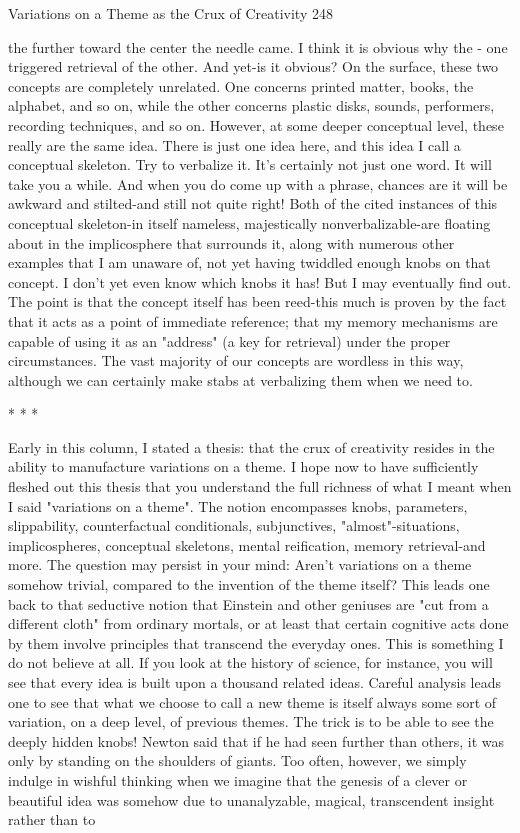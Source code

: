 Variations on a Theme as the Crux of Creativity                                       248

the further toward the center the needle came. I think it is obvious why the - one
triggered retrieval of the other. And yet-is it obvious?
        On the surface, these two concepts are completely unrelated. One concerns
printed matter, books, the alphabet, and so on, while the other concerns plastic disks,
sounds, performers, recording techniques, and so on. However, at some deeper
conceptual level, these really are the same idea. There is just one idea here, and this
idea I call a conceptual skeleton. Try to verbalize it. It's certainly not just one word. It
will take you a while. And when you do come up with a phrase, chances are it will be
awkward and stilted-and still not quite right!
        Both of the cited instances of this conceptual skeleton-in itself nameless,
majestically nonverbalizable-are floating about in the implicosphere that surrounds it,
along with numerous other examples that I am unaware of, not yet having twiddled
enough knobs on that concept. I don't yet even know which knobs it has! But I may
eventually find out. The point is that the concept itself has been reed-this much is
proven by the fact that it acts as a point of immediate reference; that my memory
mechanisms are capable of using it as an "address" (a key for retrieval) under the
proper circumstances. The vast majority of our concepts are wordless in this way,
although we can certainly make stabs at verbalizing them when we need to.


                                     *       *       *

         Early in this column, I stated a thesis: that the crux of creativity resides in the
ability to manufacture variations on a theme. I hope now to have sufficiently fleshed
out this thesis that you understand the full richness of what I meant when I said
"variations on a theme". The notion encompasses knobs, parameters, slippability,
counterfactual conditionals, subjunctives, "almost"-situations, implicospheres,
conceptual skeletons, mental reification, memory retrieval-and more.
         The question may persist in your mind: Aren't variations on a theme somehow
trivial, compared to the invention of the theme itself? This leads one back to that
seductive notion that Einstein and other geniuses are "cut from a different cloth" from
ordinary mortals, or at least that certain cognitive acts done by them involve
principles that transcend the everyday ones. This is something I do not believe at all.
If you look at the history of science, for instance, you will see that every idea is built
upon a thousand related ideas. Careful analysis leads one to see that what we choose
to call a new theme is itself always some sort of variation, on a deep level, of previous
themes. The trick is to be able to see the deeply hidden knobs!
         Newton said that if he had seen further than others, it was only by standing on
the shoulders of giants. Too often, however, we simply indulge in wishful thinking
when we imagine that the genesis of a clever or beautiful idea was somehow due to
unanalyzable, magical, transcendent insight rather than to




